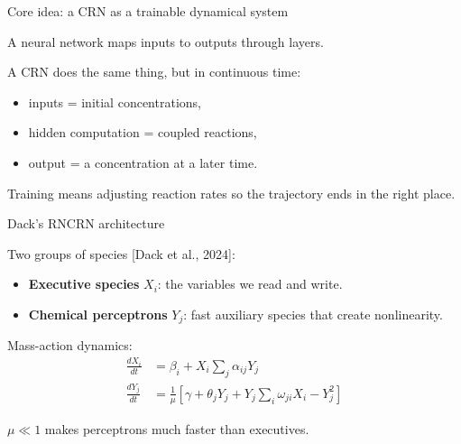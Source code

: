 \documentclass[aspectratio=169,11pt]{beamer}
\newcommand{\citeslide}[1]{\hfill{\footnotesize [#1]}}
\begin{document}
\begin{frame}{Core idea: a CRN as a trainable dynamical system}

A neural network maps inputs to outputs through layers.

\vspace{0.3cm}
A CRN does the same thing, but in continuous time:
\begin{itemize}
    \item inputs = initial concentrations,
    \item hidden computation = coupled reactions,
    \item output = a concentration at a later time.
\end{itemize}

\vspace{0.3cm}
Training means adjusting reaction rates so the trajectory ends in the right place.

\end{frame}

\begin{frame}{Dack's RNCRN architecture}

Two groups of species \citeslide{Dack et al., 2024}:
\begin{itemize}
    \item \textbf{Executive species} $X_i$: the variables we read and write.
    \item \textbf{Chemical perceptrons} $Y_j$: fast auxiliary species that create nonlinearity.
\end{itemize}

\vspace{0.3cm}
Mass-action dynamics:
\begin{align*}
    \frac{dX_i}{dt} &= \beta_i + X_i \sum_j \alpha_{ij} Y_j \\[0.5em]
    \frac{dY_j}{dt} &= \frac{1}{\mu} \left[ \gamma + \theta_j Y_j + Y_j \sum_i \omega_{ji} X_i - Y_j^2 \right]
\end{align*}

\vspace{0.2cm}
$\mu \ll 1$ makes perceptrons much faster than executives.

\end{frame}
\end{document}
